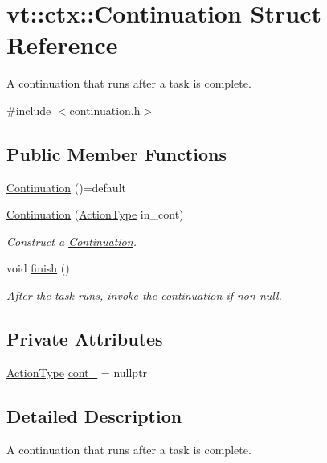\hypertarget{structvt_1_1ctx_1_1_continuation}{}\section{vt\+:\+:ctx\+:\+:Continuation Struct Reference}
\label{structvt_1_1ctx_1_1_continuation}


A continuation that runs after a task is complete.  




{\ttfamily \#include $<$continuation.\+h$>$}

\subsection*{Public Member Functions}
\begin{DoxyCompactItemize}
\item 
\hyperlink{structvt_1_1ctx_1_1_continuation_a161c480097907c7cc11f112ea6130a39}{Continuation} ()=default
\item 
\hyperlink{structvt_1_1ctx_1_1_continuation_ad18f8613f142fa3ed0e08f9d8df4e05a}{Continuation} (\hyperlink{namespacevt_ae0a5a7b18cc99d7b732cb4d44f46b0f3}{Action\+Type} in\+\_\+cont)
\begin{DoxyCompactList}\small\item\em Construct a {\ttfamily \hyperlink{structvt_1_1ctx_1_1_continuation}{Continuation}}. \end{DoxyCompactList}\item 
void \hyperlink{structvt_1_1ctx_1_1_continuation_a96c577862c9c9f2e477cfd25d6327872}{finish} ()
\begin{DoxyCompactList}\small\item\em After the task runs, invoke the continuation if non-\/null. \end{DoxyCompactList}\end{DoxyCompactItemize}
\subsection*{Private Attributes}
\begin{DoxyCompactItemize}
\item 
\hyperlink{namespacevt_ae0a5a7b18cc99d7b732cb4d44f46b0f3}{Action\+Type} \hyperlink{structvt_1_1ctx_1_1_continuation_aadaa0a147af8e8bba30684a098a5eb39}{cont\+\_\+} = nullptr
\end{DoxyCompactItemize}


\subsection{Detailed Description}
A continuation that runs after a task is complete. 

